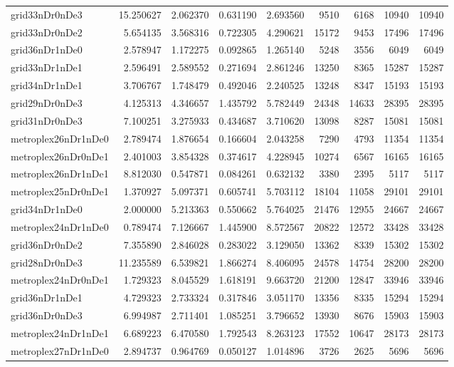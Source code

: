 \begin{longtable}{|l|r|r|r|r|r|r|r|r|}
grid33nDr0nDe3 & 15.250627 & 2.062370 & 0.631190 & 2.693560 & 9510 & 6168 & 10940 & 10940 \\
grid33nDr0nDe2 & 5.654135 & 3.568316 & 0.722305 & 4.290621 & 15172 & 9453 & 17496 & 17496 \\
grid36nDr1nDe0 & 2.578947 & 1.172275 & 0.092865 & 1.265140 & 5248 & 3556 & 6049 & 6049 \\
grid33nDr1nDe1 & 2.596491 & 2.589552 & 0.271694 & 2.861246 & 13250 & 8365 & 15287 & 15287 \\
grid34nDr1nDe1 & 3.706767 & 1.748479 & 0.492046 & 2.240525 & 13248 & 8347 & 15193 & 15193 \\
grid29nDr0nDe3 & 4.125313 & 4.346657 & 1.435792 & 5.782449 & 24348 & 14633 & 28395 & 28395 \\
grid31nDr0nDe3 & 7.100251 & 3.275933 & 0.434687 & 3.710620 & 13098 & 8287 & 15081 & 15081 \\
metroplex26nDr1nDe0 & 2.789474 & 1.876654 & 0.166604 & 2.043258 & 7290 & 4793 & 11354 & 11354 \\
metroplex26nDr0nDe1 & 2.401003 & 3.854328 & 0.374617 & 4.228945 & 10274 & 6567 & 16165 & 16165 \\
metroplex26nDr1nDe1 & 8.812030 & 0.547871 & 0.084261 & 0.632132 & 3380 & 2395 & 5117 & 5117 \\
metroplex25nDr0nDe1 & 1.370927 & 5.097371 & 0.605741 & 5.703112 & 18104 & 11058 & 29101 & 29101 \\
grid34nDr1nDe0 & 2.000000 & 5.213363 & 0.550662 & 5.764025 & 21476 & 12955 & 24667 & 24667 \\
metroplex24nDr1nDe0 & 0.789474 & 7.126667 & 1.445900 & 8.572567 & 20822 & 12572 & 33428 & 33428 \\
grid36nDr0nDe2 & 7.355890 & 2.846028 & 0.283022 & 3.129050 & 13362 & 8339 & 15302 & 15302 \\
grid28nDr0nDe3 & 11.235589 & 6.539821 & 1.866274 & 8.406095 & 24578 & 14754 & 28200 & 28200 \\
metroplex24nDr0nDe1 & 1.729323 & 8.045529 & 1.618191 & 9.663720 & 21200 & 12847 & 33946 & 33946 \\
grid36nDr1nDe1 & 4.729323 & 2.733324 & 0.317846 & 3.051170 & 13356 & 8335 & 15294 & 15294 \\
grid36nDr0nDe3 & 6.994987 & 2.711401 & 1.085251 & 3.796652 & 13930 & 8676 & 15903 & 15903 \\
metroplex24nDr1nDe1 & 6.689223 & 6.470580 & 1.792543 & 8.263123 & 17552 & 10647 & 28173 & 28173 \\
metroplex27nDr1nDe0 & 2.894737 & 0.964769 & 0.050127 & 1.014896 & 3726 & 2625 & 5696 & 5696 \\

\end{longtable}
